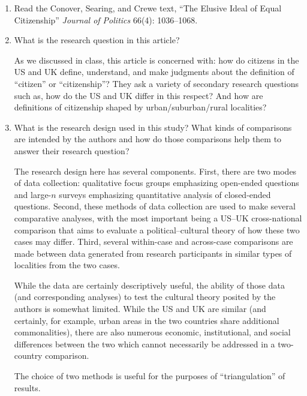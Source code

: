 \documentclass[a4paper]{exam}
\begin{document}
\begin{enumerate}
\item Read the Conover, Searing, and Crewe text, ``The Elusive Ideal of Equal Citizenship'' \textit{Journal of Politics} 66(4): 1036--1068.

\item What is the research question in this article?

\begin{solution}

As we discussed in class, this article is concerned with: how do citizens in the US and UK define, understand, and make judgments about the definition of ``citizen'' or ``citizenship''? They ask a variety of secondary research questions such as, how do the US and UK differ in this respect? And how are definitions of citizenship shaped by urban/suburban/rural localities?

\end{solution}

\item What is the research design used in this study? What kinds of comparisons are intended by the authors and how do those comparisons help them to answer their research question?

\begin{solution}

The research design here has several components. First, there are two modes of data collection: qualitative focus groups emphasizing open-ended questions and large-$n$ surveys emphasizing quantitative analysis of closed-ended questions. Second, these methods of data collection are used to make several comparative analyses, with the most important being a US--UK cross-national comparison that aims to evaluate a political--cultural theory of how these two cases may differ. Third, several within-case and across-case comparisons are made between data generated from research participants in similar types of localities from the two cases.

While the data are certainly descriptively useful, the ability of those data (and corresponding analyses) to test the cultural theory posited by the authors is somewhat limited. While the US and UK are similar (and certainly, for example, urban areas in the two countries share additional commonalities), there are also numerous economic, institutional, and social differences between the two which cannot necessarily be addressed in a two-country comparison.

The choice of two methods is useful for the purposes of ``triangulation'' of results.


\end{solution}
\end{enumerate}
\end{document}
